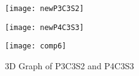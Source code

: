 \begin{figure}[H]
\begin{minipage}{.5\textwidth}
  \centering
  \texttt{[image: newP3C3S2]}
  \label{fig:test1}
\end{minipage}
\begin{minipage}{.5\textwidth}
  \centering
  \texttt{[image: newP4C3S3]}
  \label{fig:test2}
\end{minipage}
\end{figure}

\begin{figure}[H]
\caption{3D Graph of P3C3S2 and P4C3S3}
\centering
\texttt{[image: comp6]}
\end{figure}

